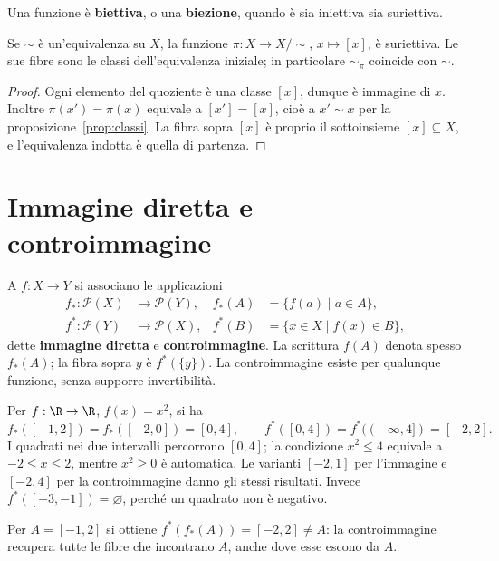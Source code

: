 \begin{definizione}
Una funzione è \textbf{biettiva}, o una \textbf{biezione}, quando è sia iniettiva sia suriettiva.
\end{definizione}

\begin{proposizione}
Se $\sim$ è un'equivalenza su $X$, la funzione $\pi:X\to X/{\sim}$, $x\mapsto[x]$, è suriettiva. Le sue fibre sono le classi dell'equivalenza iniziale; in particolare $\sim_\pi$ coincide con $\sim$.
\end{proposizione}
\begin{proof}
Ogni elemento del quoziente è una classe $[x]$, dunque è immagine di $x$. Inoltre $\pi(x')=\pi(x)$ equivale a $[x']=[x]$, cioè a $x'\sim x$ per la proposizione~\ref{prop:classi}. La fibra sopra $[x]$ è proprio il sottoinsieme $[x]\subseteq X$, e l'equivalenza indotta è quella di partenza.
\end{proof}

\section{Immagine diretta e controimmagine}
\begin{definizione}
A $f:X\to Y$ si associano le applicazioni
\[
\begin{aligned}
f_*:\mathcal P(X)&\to\mathcal P(Y),& f_*(A)&=\{f(a)\mid a\in A\},\\
f^*:\mathcal P(Y)&\to\mathcal P(X),& f^*(B)&=\{x\in X\mid f(x)\in B\},
\end{aligned}
\]
dette \textbf{immagine diretta} e \textbf{controimmagine}. La scrittura $f(A)$ denota spesso $f_*(A)$; la fibra sopra $y$ è $f^*(\{y\})$. La controimmagine esiste per qualunque funzione, senza supporre invertibilità.
\end{definizione}

\begin{esempio}[Il quadrato]
Per $f:\R\to\R$, $f(x)=x^2$, si ha
\[
f_*([-1,2])=f_*([-2,0])=[0,4],\qquad
f^*([0,4])=f^*((-\infty,4])=[-2,2].
\]
I quadrati nei due intervalli percorrono $[0,4]$; la condizione $x^2\le4$ equivale a $-2\le x\le2$, mentre $x^2\ge0$ è automatica. Le varianti $[-2,1]$ per l'immagine e $[-2,4]$ per la controimmagine danno gli stessi risultati. Invece $f^*([-3,-1])=\varnothing$, perché un quadrato non è negativo.

Per $A=[-1,2]$ si ottiene $f^*(f_*(A))=[-2,2]\ne A$: la controimmagine recupera tutte le fibre che incontrano $A$, anche dove esse escono da $A$.
\end{esempio}

